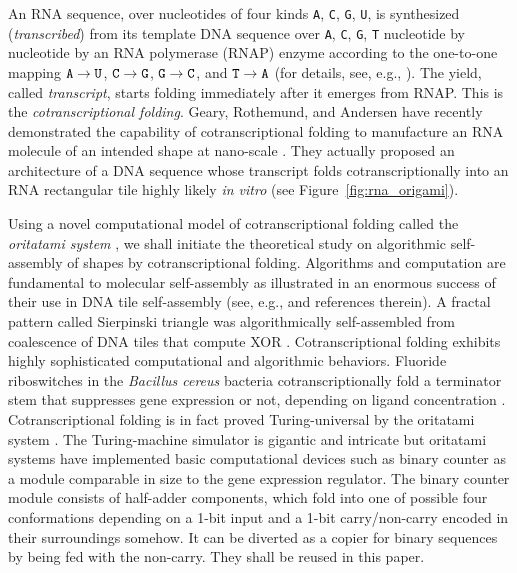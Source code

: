 \documentclass{article}
\theoremstyle{remark}
\begin{document}
An RNA sequence, over nucleotides of four kinds {\tt A}, {\tt C}, {\tt G}, {\tt U}, is synthesized (\textit{transcribed}) from its template DNA sequence over {\tt A}, {\tt C}, {\tt G}, {\tt T} nucleotide by nucleotide by an RNA polymerase (RNAP) enzyme according to the one-to-one mapping ${\tt A} \to {\tt U}$, ${\tt C} \to {\tt G}$, ${\tt G} \to {\tt C}$, and ${\tt T} \to {\tt A}$ (for details, see, e.g., \cite{AJLMRRW2014}). 
The yield, called \textit{transcript}, starts folding immediately after it emerges from RNAP. 
This is the \textit{cotranscriptional folding}. 
Geary, Rothemund, and Andersen have recently demonstrated the capability of cotranscriptional folding to manufacture an RNA molecule of an intended shape at nano-scale \cite{GearyRothemundAndersen2014}. 
They actually proposed an architecture of a DNA sequence whose transcript folds cotranscriptionally into an RNA rectangular tile highly likely \textit{in vitro} (see Figure~\ref{fig:rna_origami}). 

Using a novel computational model of cotranscriptional folding called the \textit{oritatami system} \cite{GeMeScSe2016}, we shall initiate the theoretical study on algorithmic self-assembly of shapes by cotranscriptional folding. 
Algorithms and computation are fundamental to molecular self-assembly as illustrated in an enormous success of their use in DNA tile self-assembly (see, e.g., \cite{Doty2012, Patitz2016, WinfreePhD} and references therein). 
A fractal pattern called Sierpinski triangle was algorithmically self-assembled from coalescence of DNA tiles that compute XOR \cite{RothemundPapadakisWinfree2004}. 
Cotranscriptional folding exhibits highly sophisticated computational and algorithmic behaviors. 
Fluoride riboswitches in the \textit{Bacillus cereus} bacteria cotranscriptionally fold a terminator stem that suppresses gene expression or not, depending on ligand concentration \cite{WaStYuLiLu2016}. 
Cotranscriptional folding is in fact proved Turing-universal by the oritatami system \cite{GeMeScSe2015}. 
The Turing-machine simulator is gigantic and intricate but oritatami systems have implemented basic computational devices such as binary counter \cite{GeMeScSe2016} as a module comparable in size to the gene expression regulator. 
The binary counter module consists of half-adder components, which fold into one of possible four conformations depending on a 1-bit input and a 1-bit carry/non-carry encoded in their surroundings somehow. 
It can be diverted as a copier for binary sequences by being fed with the non-carry. 
They shall be reused in this paper. 
\end{document}
